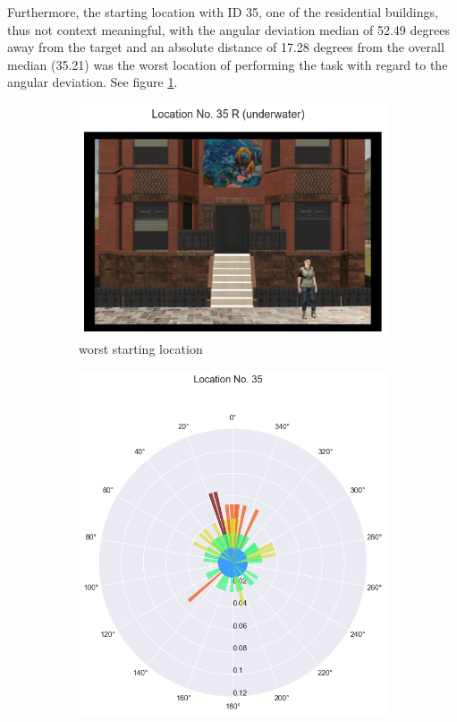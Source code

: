 Furthermore, the starting location with ID 35, one of the residential buildings, thus not context meaningful, with the angular deviation median of 52.49 degrees away from the target and an absolute distance of 17.28 degrees from the overall median (35.21) was the worst location of performing the task with regard to the angular deviation. See figure \ref{fig:worst_angular}.

\begin{figure}[!htb]
	\begin{subfigure}[b]{0.48\linewidth}
		\includegraphics[width=\linewidth]{figures/worst_loc_angular_error__withHA_23.png}
		\caption{worst starting location}
		\label{fig:worst_angular}
	\end{subfigure}
	\begin{subfigure}[b]{0.48\linewidth}
		\includegraphics[width=\linewidth]{figures/deviation_degrees_loc_nr_35_23.png}

\end{subfigure}
\end{figure}
